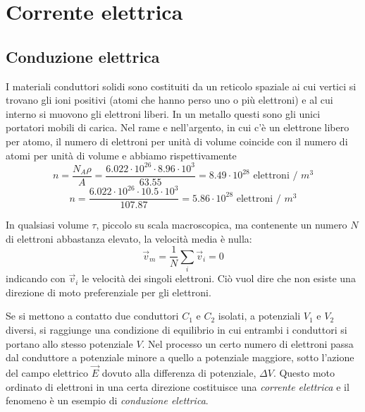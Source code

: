 \documentclass[class=book, crop=false, oneside, 12pt]{standalone}
\begin{document}
\chapter{Corrente elettrica}

\section{Conduzione elettrica}

I materiali conduttori solidi sono costituiti da un reticolo spaziale ai cui vertici si trovano gli ioni positivi (atomi che hanno perso uno o più elettroni) e al cui interno si muovono gli elettroni liberi. 
In un metallo questi sono gli unici portatori mobili di carica. 
Nel rame e nell'argento, in cui c'è un elettrone libero per atomo, il numero di elettroni per unità di volume coincide con il numero di atomi per unità di volume e abbiamo rispettivamente
\begin{equation*}
    n = \frac{N_A \rho}{A} = \frac{6.022 \cdot 10^{26} \cdot 8.96 \cdot 10^3}{63.55} = 8.49 \cdot 10^{28} \text{ elettroni / }m^3
\end{equation*}
\begin{equation*}
    n = \frac{6.022 \cdot 10^{26} \cdot 10.5 \cdot 10^3}{107.87} = 5.86 \cdot 10^{28} \text{ elettroni / }m^3
\end{equation*}

In qualsiasi volume \(\tau\), piccolo su scala macroscopica, ma contenente un numero \(N\) di elettroni abbastanza elevato, la velocità media è nulla: 
\begin{equation*}
    \overrightarrow{v}_m = \frac{1}{N} \sum_i \overrightarrow{v}_i = 0
\end{equation*}
indicando con \(\overrightarrow{v}_i\) le velocità dei singoli elettroni. 
Ciò vuol dire che non esiste una direzione di moto preferenziale per gli elettroni.

Se si mettono a contatto due conduttori \(C_1\) e \(C_2\) isolati, a potenziali \(V_1\) e \(V_2\) diversi, si raggiunge una condizione di equilibrio in cui entrambi i conduttori si portano allo stesso potenziale \(V\). 
Nel processo un certo numero di elettroni passa dal conduttore a potenziale minore a quello a potenziale maggiore, sotto l'azione del campo elettrico \(\overrightarrow{E}\) dovuto alla differenza di potenziale, \(\Delta V\). 
Questo moto ordinato di elettroni in una certa direzione costituisce una \emph{corrente elettrica} e il fenomeno è un esempio di \emph{conduzione elettrica}.
\end{document}
